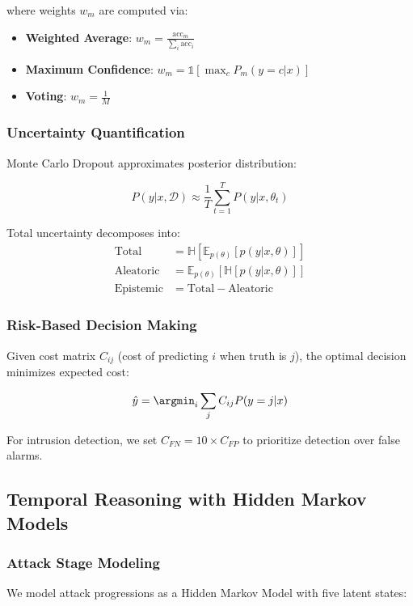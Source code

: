 \documentclass[conference]{IEEEtran}
\begin{document}
where weights $w_m$ are computed via:
\begin{itemize}
    \item \textbf{Weighted Average}: $w_m = \frac{\text{acc}_m}{\sum_i \text{acc}_i}$
    \item \textbf{Maximum Confidence}: $w_m = \mathbb{1}[\max_c P_m(y=c|x)]$
    \item \textbf{Voting}: $w_m = \frac{1}{M}$
\end{itemize}

\subsubsection{Uncertainty Quantification}
Monte Carlo Dropout approximates posterior distribution:

\begin{equation}
P(y|x,\mathcal{D}) \approx \frac{1}{T} \sum_{t=1}^{T} P(y|x,\theta_t)
\end{equation}

Total uncertainty decomposes into:
\begin{align}
\text{Total} &= \mathbb{H}[\mathbb{E}_{p(\theta)}[p(y|x,\theta)]] \\
\text{Aleatoric} &= \mathbb{E}_{p(\theta)}[\mathbb{H}[p(y|x,\theta)]] \\
\text{Epistemic} &= \text{Total} - \text{Aleatoric}
\end{align}

\subsubsection{Risk-Based Decision Making}
Given cost matrix $C_{ij}$ (cost of predicting $i$ when truth is $j$), the optimal decision minimizes expected cost:

\begin{equation}
\hat{y} = \argmin_i \sum_j C_{ij} P(y=j|x)
\end{equation}

For intrusion detection, we set $C_{FN} = 10 \times C_{FP}$ to prioritize detection over false alarms.

\subsection{Temporal Reasoning with Hidden Markov Models}

\subsubsection{Attack Stage Modeling}
We model attack progressions as a Hidden Markov Model with five latent states:
\end{document}
